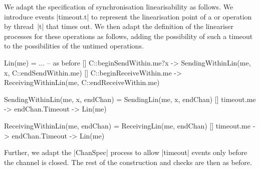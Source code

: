 
\inlineCSP

We adapt the specification of synchronisation linearisability as follows.  We
introduce events |timeout.t| to represent the linearisation point of a
 or  operation by thread~|t| that times
out.  We then adapt the definition of the lineariser processes for these
operations as follows, adding the possibility of such a timeout to the
possibilities of the untimed operations.
%
\begin{cspm}
Lin(me) = 
  ... -- as before
  [] C::beginSendWithin.me?x -> SendingWithinLin(me, x, C::endSendWithin.me)
  [] C::beginReceiveWithin.me -> ReceivingWithinLin(me, C::endReceiveWithin.me)

SendingWithinLin(me, x, endChan) = 
  SendingLin(me, x, endChan)
  [] timeout.me -> endChan.Timeout -> Lin(me)

ReceivingWithinLin(me, endChan) = 
  ReceivingLin(me, endChan) 
  [] timeout.me -> endChan.Timeout -> Lin(me)
\end{cspm}
%
Further, we adapt the |ChanSpec| process to allow |timeout| events only before
the channel is closed.  The rest of the construction and checks are then as
before. 
